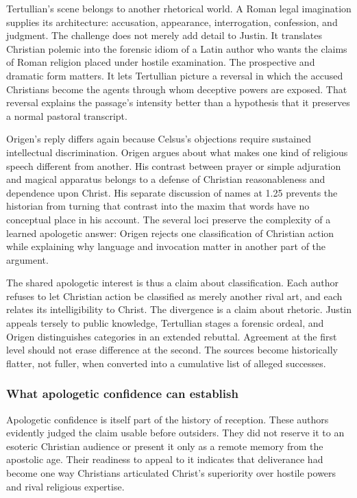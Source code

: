 Tertullian's scene belongs to another rhetorical world. A Roman legal
imagination supplies its architecture: accusation, appearance, interrogation,
confession, and judgment. The challenge does not merely add detail to Justin.
It translates Christian polemic into the forensic idiom of a Latin author who
wants the claims of Roman religion placed under hostile examination. The
prospective and dramatic form matters. It lets Tertullian picture a reversal
in which the accused Christians become the agents through whom deceptive
powers are exposed. That reversal explains the passage's intensity better
than a hypothesis that it preserves a normal pastoral transcript.

Origen's reply differs again because Celsus's objections require sustained
intellectual discrimination. Origen argues about what makes one kind of
religious speech different from another. His contrast between prayer or
simple adjuration and magical apparatus belongs to a defense of Christian
reasonableness and dependence upon Christ. His separate discussion of names
at 1.25 prevents the historian from turning that contrast into the maxim that
words have no conceptual place in his account. The several loci preserve the
complexity of a learned apologetic answer: Origen rejects one classification
of Christian action while explaining why language and invocation matter in
another part of the argument.

The shared apologetic interest is thus a claim about classification. Each
author refuses to let Christian action be classified as merely another rival
art, and each relates its intelligibility to Christ. The divergence is a
claim about rhetoric. Justin appeals tersely to public knowledge, Tertullian
stages a forensic ordeal, and Origen distinguishes categories in an extended
rebuttal. Agreement at the first level should not erase difference at the
second. The sources become historically flatter, not fuller, when converted
into a cumulative list of alleged successes.

\subsubsection{What apologetic confidence can establish}

Apologetic confidence is itself part of the history of reception. These
authors evidently judged the claim usable before outsiders. They did not
reserve it to an esoteric Christian audience or present it only as a remote
memory from the apostolic age. Their readiness to appeal to it indicates that
deliverance had become one way Christians articulated Christ's superiority
over hostile powers and rival religious expertise.

